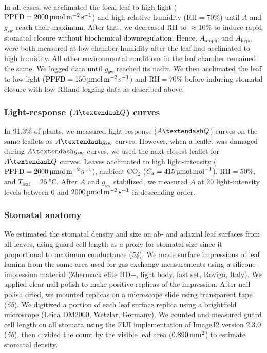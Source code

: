 \documentclass[
  letterpaper,
  DIV=11,
  numbers=noendperiod]{scrartcl}
\newcommand{\Aamphi}{$A_{\mathrm{amphi}}$}
\newcommand{\Ahypo}{$A_{\mathrm{hypo}}$}
\newcommand{\agcurve}{$A \textendash g_\text{sw}$}
\newcommand{\aqcurve}{$A \textendash Q$}
\newcommand{\caequals}[1]{$C_\mathrm{a} = \qty{#1}{\micro\mol\raiseto{-1}\mol}$}
\newcommand{\gsw}{$g_\text{sw}$}
\newcommand{\ppfdequals}[1]{$\mathrm{PPFD} = \qty{#1}{\micro\mol\raiseto{-2}\meter\raiseto{-1}\second}$}
\newcommand{\rh}{$\mathrm{RH}$}
\newcommand{\rhequals}[1]{$\mathrm{RH} = #1\%$}
\newcommand{\tleafequals}[1]{$T_\mathrm{leaf} = \qty{#1}{\degreeCelsius}$}
\begin{document}
In all cases, we acclimated the focal leaf to high light
(\ppfdequals{2000}) and high relative humidity (\rhequals{70}) until
\(A\) and \gsw{} reach their maximum. After that, we decreased \rh{} to
\(\approx 10\%\) to induce rapid stomatal closure without biochemical
downregulation. Hence, \Aamphi{} and \Ahypo{} were both measured at low
chamber humidity after the leaf had acclimated to high humidity. All
other environmental conditions in the leaf chamber remained the same. We
logged data until \gsw{} reached its nadir. We then acclimated the leaf
to low light (\ppfdequals{150}) and \rhequals{70} before inducing
stomatal closure with low \rh and logging data as described above.

\subsubsection{\texorpdfstring{Light-response (\aqcurve)
curves}{Light-response () curves}}\label{light-response-curves}

In 91.3\% of plants, we measured light-response (\aqcurve) curves on the
same leaflets as \agcurve{} curves. However, when a leaflet was damaged
during \agcurve{} curves, we used the next closest leaflet for
\aqcurve{} curves. Leaves acclimated to high light-intensity
(\ppfdequals{2000}), ambient CO\(_2\) (\caequals{415}), \rhequals{50},
and \tleafequals{25}. After \(A\) and \gsw{} stabilized, we measured
\(A\) at 20 light-intensity levels between \(0\) and
\(\qty{2000}{\micro\mol\raiseto{-2}\meter\raiseto{-1}\second}\) in
descending order.

\subsubsection{Stomatal anatomy}\label{stomatal-anatomy}

We estimated the stomatal density and size on ab- and adaxial leaf
surfaces from all leaves, using guard cell length as a proxy for
stomatal size since it proportional to maximum conductance (\emph{54}).
We made surface impressions of leaf lamina from the same area used for
gas exchange measurements using a-silicone impression material (Zhermack
elite HD+, light body, fast set, Rovigo, Italy). We applied clear nail
polish to make positive replicas of the impression. After nail polish
dried, we mounted replicas on a microscope slide using transparent tape
(\emph{55}). We digitized a portion of each leaf surface replica using a
brightfield microscope (Leica DM2000, Wetzlar, Germany). We counted and
measured guard cell length on all stomata using the FIJI implementation
of ImageJ2 version 2.3.0 (\emph{56}), then divided the count by the
visible leaf area (\(\qty{0.890}{\raiseto{2}\milli\meter}\)) to estimate
stomatal density.
\end{document}
